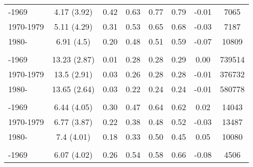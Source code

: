 \begin{ThreePartTable}
\begin{longtable}[t]{lccccccc}
\hspace{1em}-1969 & 4.17 (3.92) & 0.42 & 0.63 & 0.77 & 0.79 & -0.01 & 7065\\
\hspace{1em}1970-1979 & 5.11 (4.29) & 0.31 & 0.53 & 0.65 & 0.68 & -0.03 & 7187\\
\hspace{1em}1980- & 6.91 (4.5) & 0.20 & 0.48 & 0.51 & 0.59 & -0.07 & 10809\\
\addlinespace[0.3em]
\multicolumn{8}{l}{\textbf{United States}}\\
\hspace{1em}-1969 & 13.23 (2.87) & 0.01 & 0.28 & 0.28 & 0.29 & 0.00 & 739514\\
\hspace{1em}1970-1979 & 13.5 (2.91) & 0.03 & 0.26 & 0.28 & 0.28 & -0.01 & 376732\\
\hspace{1em}1980- & 13.65 (2.64) & 0.03 & 0.22 & 0.24 & 0.24 & -0.01 & 580778\\
\addlinespace[0.3em]
\multicolumn{8}{l}{\textbf{Zambia}}\\
\hspace{1em}-1969 & 6.44 (4.05) & 0.30 & 0.47 & 0.64 & 0.62 & 0.02 & 14043\\
\hspace{1em}1970-1979 & 6.77 (3.87) & 0.22 & 0.38 & 0.48 & 0.52 & -0.03 & 13487\\
\hspace{1em}1980- & 7.4 (4.01) & 0.18 & 0.33 & 0.50 & 0.45 & 0.05 & 10080\\
\addlinespace[0.3em]
\multicolumn{8}{l}{\textbf{Zimbabwe}}\\
\hspace{1em}-1969 & 6.07 (4.02) & 0.26 & 0.54 & 0.58 & 0.66 & -0.08 & 4506\\*
\end{longtable}
\end{ThreePartTable}
\endgroup{}
